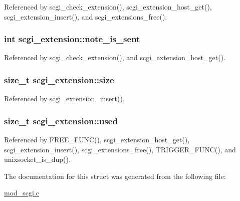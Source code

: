 Referenced by scgi\-\_\-check\-\_\-extension(), scgi\-\_\-extension\-\_\-host\-\_\-get(), scgi\-\_\-extension\-\_\-insert(), and scgi\-\_\-extensions\-\_\-free().

\hypertarget{structscgi__extension_ab74093f209555f27c49043442eaa2b12}{
\subsubsection[{note\-\_\-is\-\_\-sent}]{\setlength{\rightskip}{0pt plus 5cm}int scgi\-\_\-extension\-::note\-\_\-is\-\_\-sent}}\label{structscgi__extension_ab74093f209555f27c49043442eaa2b12}


Referenced by scgi\-\_\-check\-\_\-extension(), and scgi\-\_\-extension\-\_\-host\-\_\-get().

\hypertarget{structscgi__extension_a1c964b877584c51c1e758c2ba21ab080}{
\subsubsection[{size}]{\setlength{\rightskip}{0pt plus 5cm}size\-\_\-t scgi\-\_\-extension\-::size}}\label{structscgi__extension_a1c964b877584c51c1e758c2ba21ab080}


Referenced by scgi\-\_\-extension\-\_\-insert().

\hypertarget{structscgi__extension_a2c364e431d07495a4c5105916bf4ef94}{
\subsubsection[{used}]{\setlength{\rightskip}{0pt plus 5cm}size\-\_\-t scgi\-\_\-extension\-::used}}\label{structscgi__extension_a2c364e431d07495a4c5105916bf4ef94}


Referenced by F\-R\-E\-E\-\_\-\-F\-U\-N\-C(), scgi\-\_\-extension\-\_\-host\-\_\-get(), scgi\-\_\-extension\-\_\-insert(), scgi\-\_\-extensions\-\_\-free(), T\-R\-I\-G\-G\-E\-R\-\_\-\-F\-U\-N\-C(), and unixsocket\-\_\-is\-\_\-dup().



The documentation for this struct was generated from the following file\-:\begin{DoxyCompactItemize}
\item 
\hyperlink{mod__scgi_8c}{mod\-\_\-scgi.\-c}\end{DoxyCompactItemize}
